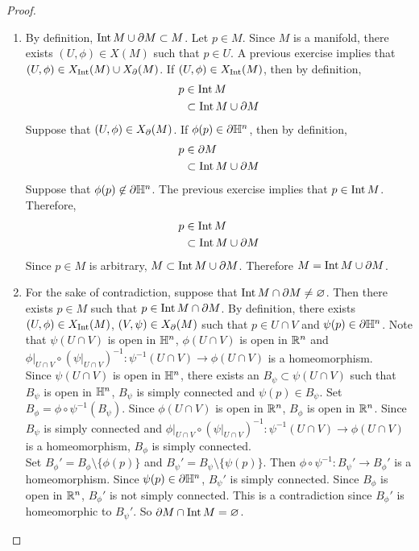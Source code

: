 \documentclass{book}
\begin{document}
	\begin{proof}\
		\begin{enumerate}
			\item By definition, $\operatorname{Int} M \cup \partial M \subset M$. Let $p \in M$. Since $M$ is a manifold, there exists $(U, \phi) \in X(M)$ such that $p \in U$. A previous exercise implies that $(U, \phi) \in X_{\operatorname{Int}}(M) \cup X_{\partial}(M)$. If $(U, \phi) \in X_{\operatorname{Int}}(M)$, then by definition, 
			\begin{align*}
				p 
				& \in \operatorname{Int} M \\
				& \subset \operatorname{Int} M \cup \partial M
			\end{align*}        
			Suppose that $(U, \phi) \in X_{\partial}(M)$. If $\phi(p) \in \partial \mathbb{H}^n$, then by definition, 
			\begin{align*}
				p 
				& \in \partial M \\
				& \subset \operatorname{Int} M \cup \partial M
			\end{align*}   
			Suppose that $\phi(p) \not \in \partial \mathbb{H}^n$. The previous exercise implies that $p \in \operatorname{Int} M$. Therefore, 
			\begin{align*}
				p 
				& \in \operatorname{Int} M \\
				& \subset \operatorname{Int} M \cup \partial M
			\end{align*}        
			Since $p \in M$ is arbitrary, $M \subset \operatorname{Int} M \cup \partial M$. Therefore $M = \operatorname{Int} M \cup \partial M$.
			\item For the sake of contradiction, suppose that $\operatorname{Int} M \cap \partial M \neq \varnothing$. Then there exists $p \in M$ such that $p \in \operatorname{Int} M \cap \partial M$. By definition, there exists $(U, \phi) \in X_{\operatorname{Int}}(M)$, $(V, \psi) \in X_{\partial}(M)$ such that $p \in U \cap V$ and $\psi(p) \in \partial \mathbb{H}^n$. Note that $\psi(U \cap V)$ is open in $\mathbb{H}^n$, $\phi(U \cap V)$ is open in $\mathbb{R}^n$ and $\phi|_{U \cap V} \circ (\psi|_{U \cap V})^{-1}: \psi^{-1}(U \cap V) \rightarrow \phi(U \cap V)$ is a homeomorphism.\\ 
			Since $\psi(U \cap V)$ is open in $\mathbb{H}^n$, there exists an $B_{\psi} \subset \psi(U \cap V)$ such that $B_{\psi}$ is open in $\mathbb{H}^n$, $B_{\psi}$ is simply connected and $\psi(p) \in B_{\psi}$. Set $B_{\phi} = \phi \circ \psi^{-1}(B_{\psi})$. Since $\phi(U \cap V)$ is open in $\mathbb{R}^n$, $B_{\phi}$ is open in $\mathbb{R}^n$. Since $B_{\psi}$ is simply connected and $\phi|_{U \cap V} \circ (\psi|_{U \cap V})^{-1}: \psi^{-1}(U \cap V) \rightarrow \phi(U \cap V)$ is a homeomorphism, $B_{\phi}$ is simply connected. \\
			Set $B_{\phi}' = B_{\phi} \setminus \{\phi(p)\}$ and $B_{\psi}' = B_{\psi} \setminus \{\psi(p)\}$. Then $\phi \circ \psi^{-1}: B_{\psi}' \rightarrow B_{\phi}'$ is a homeomorphism. Since $\psi(p) \in \partial \mathbb{H}^n$, $B_{\psi}'$ is simply connected. Since $B_{\phi}$ is open in $\mathbb{R}^n$, $B_{\phi}'$ is not simply connected. This is a contradiction since $B_{\phi}'$ is homeomorphic to $B_{\psi}'$. So $\partial M \cap \operatorname{Int} M = \varnothing$. 
		\end{enumerate}
	\end{proof}
\end{document}
